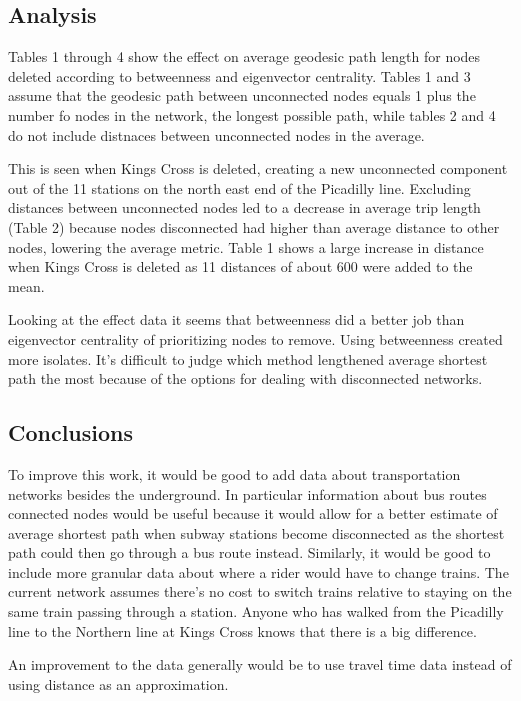 \documentclass[11pt]{article} %
\begin{document}
\subsection{Analysis}

Tables 1 through 4 show the effect on average geodesic path length for nodes deleted according to betweenness and eigenvector centrality. Tables 1 and 3 assume that the geodesic path between unconnected nodes equals 1 plus the number fo nodes in the network, the longest possible path, while tables 2 and 4 do not include distnaces between unconnected nodes in the average. 

This is seen when Kings Cross is deleted, creating a new unconnected component out of the 11 stations on the north east end of the Picadilly line. Excluding distances between unconnected nodes led to a decrease in average trip length (Table 2) because nodes disconnected had higher than average distance to other nodes, lowering the average metric.  Table 1 shows a large increase in distance when Kings Cross is deleted as 11 distances of about 600 were added to the mean. 

Looking at the effect data it seems that betweenness did a better job than eigenvector centrality of prioritizing nodes to remove. Using betweenness created more isolates. It's difficult to judge which method lengthened average shortest path the most because of the options for dealing with disconnected networks. 


\subsection{Conclusions}

To improve this work, it would be good to add data about transportation networks besides the underground. In particular information about bus routes connected nodes would be useful because it would allow for a better estimate of average shortest path when subway stations become disconnected as the shortest path could then go through a bus route instead. Similarly, it would be good to include more granular data about where a rider would have to change trains. The current network assumes there's no cost to switch trains relative to staying on the same train passing through a station. Anyone who has walked from the Picadilly line to the Northern line at Kings Cross knows that there is a big difference. 

An improvement to the data generally would be to use travel time data instead of using distance as an approximation. 
\end{document}
